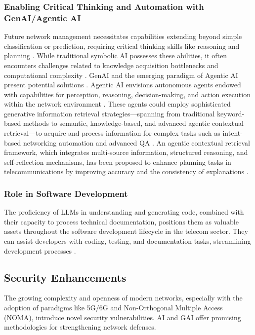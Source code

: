 \documentclass[sigconf]{acmart}
\begin{document}
\subsubsection{Enabling Critical Thinking and Automation with GenAI/Agentic AI}\label{subsubsec:agentic_ai}
Future network management necessitates capabilities extending beyond simple classification or prediction, requiring critical thinking skills like reasoning and planning \cite{ref6}. While traditional symbolic AI possesses these abilities, it often encounters challenges related to knowledge acquisition bottlenecks and computational complexity \cite{ref6}. GenAI and the emerging paradigm of Agentic AI present potential solutions \cite{ref6,ref35}. Agentic AI envisions autonomous agents endowed with capabilities for perception, reasoning, decision-making, and action execution within the network environment \cite{ref35}. These agents could employ sophisticated generative information retrieval strategies—spanning from traditional keyword-based methods to semantic, knowledge-based, and advanced agentic contextual retrieval—to acquire and process information for complex tasks such as intent-based networking automation and advanced QA \cite{ref6,ref35}. An agentic contextual retrieval framework, which integrates multi-source information, structured reasoning, and self-reflection mechanisms, has been proposed to enhance planning tasks in telecommunications by improving accuracy and the consistency of explanations \cite{ref35}.

\subsubsection{Role in Software Development} \label{subsubsec:sw_development}
The proficiency of LLMs in understanding and generating code, combined with their capacity to process technical documentation, positions them as valuable assets throughout the software development lifecycle in the telecom sector. They can assist developers with coding, testing, and documentation tasks, streamlining development processes \cite{ref18}.

\subsection{Security Enhancements}
\label{subsec:security}

The growing complexity and openness of modern networks, especially with the adoption of paradigms like 5G/6G and Non-Orthogonal Multiple Access (NOMA), introduce novel security vulnerabilities. AI and GAI offer promising methodologies for strengthening network defenses.
\end{document}
